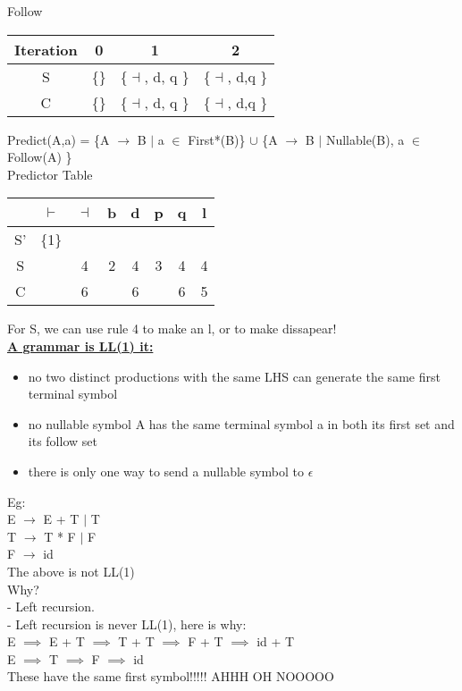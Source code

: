 \documentclass[12pt]{article}
\newcommand{\myt}[1]{\textbf{\underline{#1}}}
\begin{document}
	Follow\\
	\begin{tabular}{c | c | c | c}
		Iteration & 0 & 1 & 2\\ \hline
		S & \{\} & \{$\dashv$, d, q \}& \{$\dashv$, d,q \}\\
		C & \{\} & \{$\dashv$, d, q \}& \{$\dashv$, d,q \}\\
	\end{tabular}
	
	Predict(A,a) = \{A $\rightarrow$ B $|$ a $\in$ First*(B)\} $\cup$ \{A $\rightarrow$ B $|$ Nullable(B), a $\in$ Follow(A) \}\\
	
	Predictor Table\\
	\begin{tabular}{c | c c c c c c c }
		   & $\vdash$ & $\dashv$ & b & d & p & q & l \\ \hline
		S' & \{1\} & & & & & & \\
		S & & 4 & 2 & 4 & 3 & 4 & 4 \\
		C & & 6 & & 6 & & 6 & 5\\
	\end{tabular}
	
	For S, we can use rule 4 to make an l, or to make dissapear!\\
	
	\myt{A grammar is LL(1) it:}\\
	\begin{itemize}
		\item no two distinct productions with the same LHS can generate the same first terminal symbol
		\item no nullable symbol A has the same terminal symbol a in both its first set and its follow set
		\item there is only one way to send a nullable symbol to $\epsilon$
	\end{itemize}
	
	Eg:\\
	E $\rightarrow$ E + T $|$ T\\
	T $\rightarrow$ T * F $|$ F\\
	F $\rightarrow$ id\\
	
	The above is not LL(1)\\
	Why?\\
	- Left recursion.\\
	- Left recursion is never LL(1), here is why:\\
	
	E $\implies$ E + T $\implies$ T + T $\implies$ F + T $\implies$ id + T\\
	E $\implies$ T $\implies$ F $\implies$ id\\
	These have the same first symbol!!!!! AHHH OH NOOOOO\\
	
\end{document}
